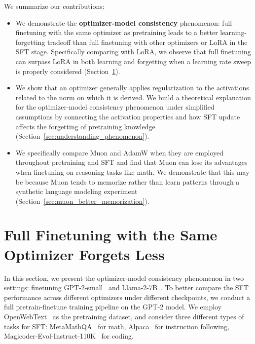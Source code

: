 \documentclass{article}
\theoremstyle{remark}
\begin{document}
We summarize our contributions:
\vspace{-0.2cm}
\begin{itemize}
    \item We demonstrate the \textbf{optimizer-model consistency} phenomenon: full finetuning with the same optimizer as pretraining leads to a better learning-forgetting tradeoff than full finetuning with other optimizers or LoRA in the SFT stage. Specifically comparing with LoRA, we observe that full finetuning can surpass LoRA in both learning and forgetting when a learning rate sweep is properly considered (Section~\ref{sec:experiments_same_optimizer_forgets_less}).
    
    \item We show that an optimizer generally applies regularization to the activations related to the norm on which it is derived. We build a theoretical explanation for the optimizer-model consistency phenomenon under simplified assumptions by connecting the activation properties and how SFT update affects the forgetting of pretraining knowledge (Section~\ref{sec:understanding_phenomenon}).
    \item We specifically compare Muon and AdamW when they are employed throughout pretraining and SFT and find that Muon can lose its advantages when finetuning on reasoning tasks like math. We demonstrate that this may be because Muon tends to memorize rather than learn patterns through a synthetic language modeling experiment (Section~\ref{sec:muon_better_memorization}).
\end{itemize}









\section{Full Finetuning with the
Same Optimizer Forgets Less}\label{sec:experiments_same_optimizer_forgets_less}
In this section, we present the optimizer-model consistency phenomenon in two settings: finetuning GPT-2-small~\citep{ouyang2022instructgpt} and Llama-2-7B~\citep{touvron2023llama}. 
To better compare the SFT performance across different optimizers under different checkpoints, we conduct a full pretrain-finetune training pipeline on the GPT-2 model. We employ OpenWebText~\citep{gokaslan2019openWeb} as the pretraining dataset, and consider three different types of tasks for SFT: MetaMathQA~\citep{yu2023metamath} for math, Alpaca~\citep{alpaca} for instruction following, Magicoder-Evol-Instruct-110K~\citep{wei2023magicoder} for coding. 
\end{document}

